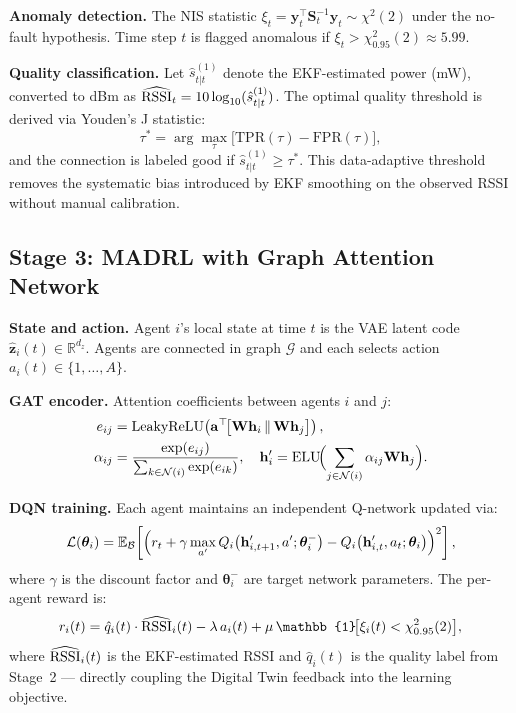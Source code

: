 \documentclass[conference]{IEEEtran}
\begin{document}
\textbf{Anomaly detection.}
The NIS statistic $\xi_t=\mathbf{y}_t^\top\mathbf{S}_t^{-1}\mathbf{y}_t
\sim\chi^2(2)$ under the no-fault hypothesis. Time step $t$ is flagged
anomalous if $\xi_t>\chi^2_{0.95}(2)\approx5.99$.

\textbf{Quality classification.}
Let $\hat{s}^{(1)}_{t|t}$ denote the EKF-estimated power (mW),
converted to dBm as $\widehat{\rm RSSI}_{t} = 10\log_{10}(\hat{s}^{(1)}_{t|t})$. The optimal
quality threshold is derived via Youden's J statistic:
\begin{equation}
\tau^*=\arg\max_\tau\bigl[\mathrm{TPR}(\tau)-\mathrm{FPR}(\tau)\bigr],
\label{eq:youden}
\end{equation}
and the connection is labeled good if $\hat{s}^{(1)}_{t|t}\geq\tau^*$.
This data-adaptive threshold removes the systematic bias introduced by
EKF smoothing on the observed RSSI without manual calibration.

\subsection{Stage 3: MADRL with Graph Attention Network}

\textbf{State and action.}
Agent $i$'s local state at time $t$ is the VAE latent code
$\hat{\mathbf{z}}_i(t)\in\mathbb{R}^{d_z}$. Agents are connected in
graph $\mathcal{G}$ and each selects action $a_i(t)\in\{1,\ldots,A\}$.

\textbf{GAT encoder.}
Attention coefficients between agents $i$ and $j$:
\begin{align}
e_{ij}&=\mathrm{LeakyReLU}\!\left(\mathbf{a}^\top\!
  \bigl[\mathbf{W}\mathbf{h}_i\,\|\,\mathbf{W}\mathbf{h}_j\bigr]\right),
\label{eq:gat_e}\\
\alpha_{ij}&=\frac{\exp(e_{ij})}{\sum_{k\in\mathcal{N}(i)}\exp(e_{ik})},\quad
\mathbf{h}'_i=\mathrm{ELU}\!\Bigl(\sum_{j\in\mathcal{N}(i)}\alpha_{ij}\mathbf{W}\mathbf{h}_j\Bigr).
\label{eq:gat_h}
\end{align}

\textbf{DQN training.}
Each agent maintains an independent Q-network updated via:
\begin{equation}
\mathcal{L}(\bm{\theta}_i)=\mathbb{E}_{\mathcal{B}}\!\left[
  \Bigl(r_t+\gamma\max_{a'}Q_i\!\left(\mathbf{h}'_{i,t+1},a';\bm{\theta}_i^-\right)
  -Q_i\!\left(\mathbf{h}'_{i,t},a_t;\bm{\theta}_i\right)\Bigr)^2
\right],
\label{eq:dqn}
\end{equation}
where $\gamma$ is the discount factor and $\bm{\theta}_i^-$ are target
network parameters. The per-agent reward is:
\begin{equation}
r_i(t)=\hat{q}_i(t)\cdot\widehat{\rm RSSI}_i(t)
       -\lambda\,a_i(t)
       +\mu\,\mathbb{1}\!\bigl[\xi_i(t)<\chi^2_{0.95}(2)\bigr],
\label{eq:reward}
\end{equation}
where $\widehat{\rm RSSI}_i(t)$ is the EKF-estimated RSSI and $\hat{q}_i(t)$
is the quality label from Stage~2 — directly coupling the Digital Twin
feedback into the learning objective.
\end{document}
